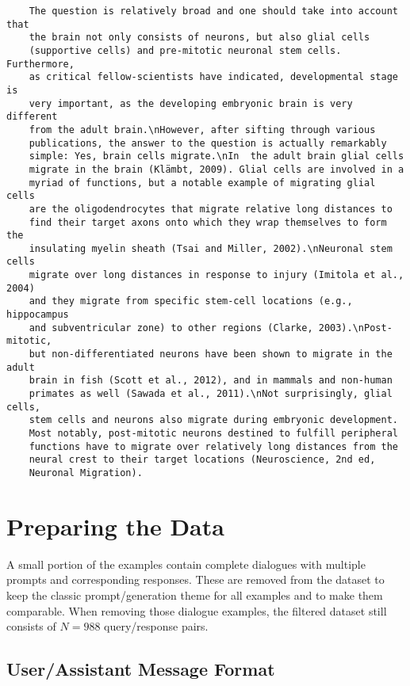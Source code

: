 \begin{verbatim}
    The question is relatively broad and one should take into account that 
    the brain not only consists of neurons, but also glial cells 
    (supportive cells) and pre-mitotic neuronal stem cells. Furthermore,
    as critical fellow-scientists have indicated, developmental stage is
    very important, as the developing embryonic brain is very different 
    from the adult brain.\nHowever, after sifting through various 
    publications, the answer to the question is actually remarkably 
    simple: Yes, brain cells migrate.\nIn  the adult brain glial cells
    migrate in the brain (Klämbt, 2009). Glial cells are involved in a
    myriad of functions, but a notable example of migrating glial cells
    are the oligodendrocytes that migrate relative long distances to 
    find their target axons onto which they wrap themselves to form the
    insulating myelin sheath (Tsai and Miller, 2002).\nNeuronal stem cells
    migrate over long distances in response to injury (Imitola et al., 2004)
    and they migrate from specific stem-cell locations (e.g., hippocampus 
    and subventricular zone) to other regions (Clarke, 2003).\nPost-mitotic,
    but non-differentiated neurons have been shown to migrate in the adult 
    brain in fish (Scott et al., 2012), and in mammals and non-human 
    primates as well (Sawada et al., 2011).\nNot surprisingly, glial cells, 
    stem cells and neurons also migrate during embryonic development. 
    Most notably, post-mitotic neurons destined to fulfill peripheral 
    functions have to migrate over relatively long distances from the 
    neural crest to their target locations (Neuroscience, 2nd ed, 
    Neuronal Migration).
\end{verbatim}

\section{Preparing the Data}
A small portion of the examples contain complete dialogues with multiple prompts and corresponding responses. These are removed from the dataset to keep the classic prompt/generation theme for all examples and to make them comparable. When removing those dialogue examples, the filtered dataset still consists of $N = 988$ query/response pairs.

\subsection{User/Assistant Message Format}\label{subsec:message_format}

